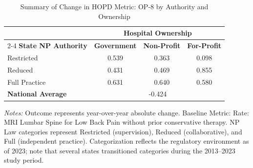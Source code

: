 \begin{table}[htbp]
    \centering
    \caption{Summary of Change in HOPD Metric: OP-8 by Authority and Ownership}
    \label{tab:d_hopd_op_8}
    \vspace{0.2cm}
    \begin{tabular}{lccc}
        \toprule
        & \multicolumn{3}{c}{\textbf{Hospital Ownership}} \\
        \cmidrule(lr){2-4}
        \textbf{State NP Authority} & \textbf{Government} & \textbf{Non-Profit} & \textbf{For-Profit} \\
        \midrule
        Restricted & 0.539 & 0.363 & 0.098 \\
        Reduced & 0.431 & 0.469 & 0.855 \\
        Full Practice & 0.631 & 0.640 & 0.580 \\
        \midrule
        \textbf{National Average} & \multicolumn{3}{c}{-0.424} \\
        \bottomrule
    \end{tabular}
    \vspace{0.1cm}
    \begin{minipage}{0.85\textwidth}
        \footnotesize \textit{Notes:} Outcome represents year-over-year absolute change. Baseline Metric: Rate: MRI Lumbar Spine for Low Back Pain without prior conservative therapy. NP Law categories represent Restricted (supervision), Reduced (collaborative), and Full (independent practice). Categorization reflects the regulatory environment as of 2023; note that several states transitioned categories during the 2013--2023 study period.
    \end{minipage}
\end{table}
